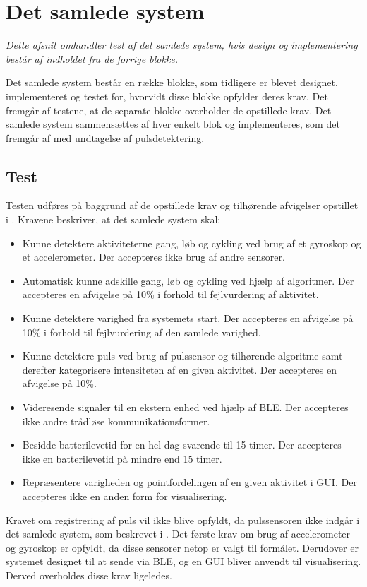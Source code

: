 \section{Det samlede system}\label{sec:samlet_system}
\textit{Dette afsnit omhandler test af det samlede system, hvis design og implementering består af indholdet fra de forrige blokke.}

Det samlede system består en række blokke, som tidligere er blevet designet, implementeret og testet for, hvorvidt disse blokke opfylder deres krav. Det fremgår af testene, at de separate blokke overholder de opstillede krav. Det samlede system sammensættes af hver enkelt blok og implementeres, som det fremgår af  med undtagelse af pulsdetektering. 

\subsection{Test}
Testen udføres på baggrund af de opstillede krav og tilhørende afvigelser opstillet i . Kravene beskriver, at det samlede system skal:
\begin{itemize}
	\item Kunne detektere aktiviteterne gang, løb og cykling ved brug af et gyroskop og et accelerometer. Der accepteres ikke brug af andre sensorer.
	\item Automatisk kunne adskille gang, løb og cykling ved hjælp af algoritmer. Der accepteres en afvigelse på 10\% i forhold til fejlvurdering af aktivitet.
	\item Kunne detektere varighed fra systemets start. Der accepteres en afvigelse på 10\% i forhold til fejlvurdering af den samlede varighed.	
	\item Kunne detektere puls ved brug af pulssensor og tilhørende algoritme samt derefter kategorisere intensiteten af en given aktivitet. Der accepteres en afvigelse på 10\%.
	\item Videresende signaler til en ekstern enhed ved hjælp af BLE. Der accepteres ikke andre trådløse kommunikationsformer.
	\item Besidde batterilevetid for en hel dag svarende til 15 timer. Der accepteres ikke en batterilevetid på mindre end 15 timer.
	\item Repræsentere varigheden og pointfordelingen af en given aktivitet i GUI. Der accepteres ikke en anden form for visualisering.	
\end{itemize}
Kravet om registrering af puls vil ikke blive opfyldt, da pulssensoren ikke indgår i det samlede system, som beskrevet i . Det første krav om brug af accelerometer og gyroskop er opfyldt, da disse sensorer netop er valgt til formålet. Derudover er systemet designet til at sende via BLE, og en GUI bliver anvendt til visualisering. Derved overholdes disse krav ligeledes. \\
